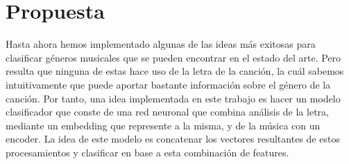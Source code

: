 \documentclass[colorinlistoftodos,twoside,twocolumn,10pt]{article} %
\begin{document}
	\section{Propuesta}
	
	
	
Hasta ahora hemos implementado algunas de las ideas m\'as exitosas para clasificar g\'eneros musicales que se pueden encontrar en el estado del arte. Pero resulta que ninguna de estas hace uso de la letra de la canci\'on, la cu\'al sabemos intuitivamente que puede aportar bastante informaci\'on sobre el g\'enero de la canci\'on. Por tanto, una idea implementada en este trabajo es hacer un modelo clasificador que conste de una red neuronal que combina análisis de la letra, mediante un embedding que represente a la misma, y de la música con un encoder. La idea de este modelo es concatenar los vectores resultantes de estos procesamientos y clasificar en base a esta combinación de features. 
	
\end{document}
